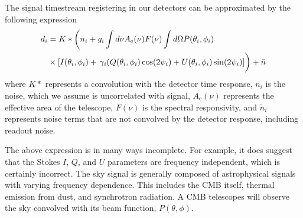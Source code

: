 The signal timestream registering in our detectors can be approximated by the following expression
\begin{equation}
\begin{split}
d _i &= K \ast \left( n_i + g_i \int d \nu A_\mathrm{e} (\nu) F(\nu) \int d\Omega P (\theta _i,\phi _i) \right. \\ 
&\times [I(\theta _i, \phi _i) + \left. \gamma _i (Q(\theta _i,\phi _i)\cos (2\psi _i) + U(\theta _i,\phi _i) \sin (2\psi _i) ]  \vphantom{\int } \right) + \tilde{n}
\end{split}
\end{equation}
where $K \ast$ represents a convolution with the detector time response, $n_i$ is the noise, which we assume is uncorrelated with signal, $A_{\mathrm{e}} (\nu)$ represents the effective area of the telescope, $F(\nu)$ is the spectral responsivity, and $\tilde{n}_i$ represents noise terms that are not convolved by the detector response, including readout noise. 

The above expression is in many ways incomplete. For example, it does suggest that the Stokes $I$, $Q$, and $U$ parameters are frequency independent, which is certainly incorrect. The sky signal is generally composed of astrophysical signals with varying frequency dependence. This includes the CMB itself, thermal emission from dust, and synchrotron radiation. A CMB telescopes will observe the sky convolved with its beam function, $P(\theta, \phi)$.
